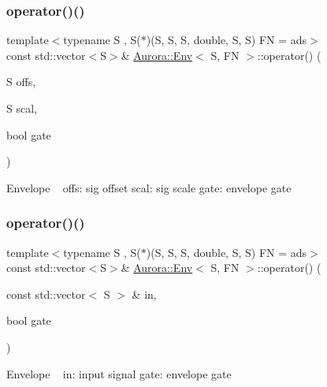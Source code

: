 \subsubsection{\texorpdfstring{operator()()}{operator()()}\hspace{0.1cm}{\footnotesize\ttfamily [2/3]}}
{\footnotesize\ttfamily template$<$typename S , S($\ast$)(\+S, S, S, double, S, S) FN = ads$>$ \\
const std\+::vector$<$S$>$\& \hyperlink{class_aurora_1_1_env}{Aurora\+::\+Env}$<$ S, FN $>$\+::operator() (\begin{DoxyParamCaption}\item[{S}]{offs,  }\item[{S}]{scal,  }\item[{bool}]{gate }\end{DoxyParamCaption})\hspace{0.3cm}{\ttfamily [inline]}}

Envelope ~\newline
offs\+: sig offset scal\+: sig scale gate\+: envelope gate \mbox{\label{class_aurora_1_1_env_aa60b54171a8ae1757d447aa42d5d00c7}} 
\subsubsection{\texorpdfstring{operator()()}{operator()()}\hspace{0.1cm}{\footnotesize\ttfamily [3/3]}}
{\footnotesize\ttfamily template$<$typename S , S($\ast$)(\+S, S, S, double, S, S) FN = ads$>$ \\
const std\+::vector$<$S$>$\& \hyperlink{class_aurora_1_1_env}{Aurora\+::\+Env}$<$ S, FN $>$\+::operator() (\begin{DoxyParamCaption}\item[{const std\+::vector$<$ S $>$ \&}]{in,  }\item[{bool}]{gate }\end{DoxyParamCaption})\hspace{0.3cm}{\ttfamily [inline]}}

Envelope ~\newline
in\+: input signal gate\+: envelope gate \mbox{\label{class_aurora_1_1_env_a2e52ca727b587d89e13a6c3832786f22}} 
